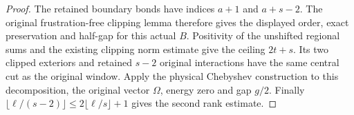 \begin{proof}\leanok
    The retained boundary bonds have indices $a+1$ and $a+s-2$.
    The original frustration-free clipping lemma therefore gives the
    displayed order, exact preservation and half-gap for this actual $B$.
    Positivity of the unshifted regional sums and the existing clipping
    norm estimate give the ceiling $2t+s$.
    Its two clipped exteriors and retained $s-2$ original interactions
    have the same central cut as the original window.
    Apply the physical Chebyshev construction to this decomposition,
    the original vector $\Omega$, energy zero and gap $g/2$.
    Finally $\lfloor\ell/(s-2)\rfloor\le2\lfloor\ell/s\rfloor+1$
    gives the second rank estimate.
\end{proof}
